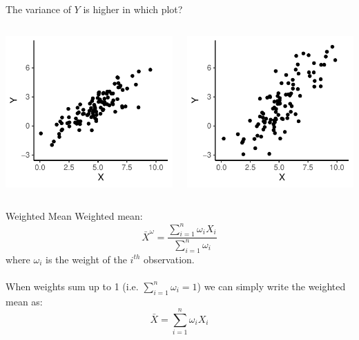 \documentclass{./../div_teaching_slides}
\begin{document}
\begin{frame}{The variance of $Y$ is higher in which plot?}
\begin{columns}
\begin{column}{0.475\textwidth}
\includegraphics{./../../Output/review_scatter1}
\end{column}
\begin{column}{0.475\textwidth}
\includegraphics{./../../Output/review_scatter2}
\end{column}
\end{columns}
\end{frame}

\begin{frame}{Weighted Mean}
Weighted mean:
$$ \bar{X}^{\omega} = \frac{\sum_{i=1}^n\omega_i X_i}{\sum_{i=1}^n \omega_i} $$
where $\omega_i$ is the weight of the $i^{th}$ observation. \\~\\ When weights sum up to 1 (i.e. \(\sum_{i=1}^n \omega_i=1\)) we can simply write the weighted mean as:
$$ \bar{X} = \sum_{i=1}^n\omega_i X_i$$ 
\end{frame}	
\end{document}
